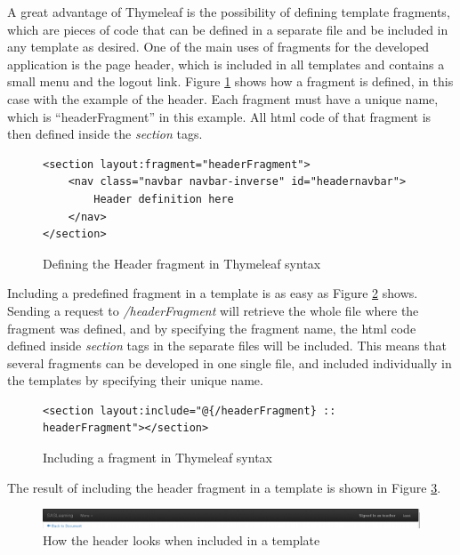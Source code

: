 A great advantage of Thymeleaf is the possibility of defining template fragments, which are pieces of code that can be defined in a separate file and be included in any template as desired. One of the main uses of fragments for the developed application is the page header, which is included in all templates and contains a small menu and the logout link. Figure \ref{figure:viewsHeaderFragment} shows how a fragment is defined, in this case with the example of the header. Each fragment must have a unique name, which is ``headerFragment'' in this example. All html code of that fragment is then defined inside the \textit{section} tags.
\begin{figure}[h]
\lstset{style=customhtml}
\begin{lstlisting}
<section layout:fragment="headerFragment">
	<nav class="navbar navbar-inverse" id="headernavbar">
		Header definition here	
	</nav>
</section>
\end{lstlisting}
\caption{Defining the Header fragment in Thymeleaf syntax}
\label{figure:viewsHeaderFragment}
\end{figure}

Including a predefined fragment in a template is as easy as Figure \ref{figure:viewsIncludeFragment} shows. Sending a request to \textit{/headerFragment} will retrieve the whole file where the fragment was defined, and by specifying the fragment name, the html code defined inside \textit{section} tags in the separate files will be included. This means that several fragments can be developed in one single file, and included individually in the templates by specifying their unique name.
\begin{figure}[h]
\lstset{style=customhtml}
\begin{lstlisting}
<section layout:include="@{/headerFragment} :: headerFragment"></section>
\end{lstlisting}
\caption{Including a fragment in Thymeleaf syntax}
\label{figure:viewsIncludeFragment}
\end{figure}

The result of including the header fragment in a template is shown in Figure \ref{figure:viewsHeaderLooks}.

\begin{figure}[h]
\centering
\includegraphics[scale=0.4]{images/header}
\caption{How the header looks when included in a template}
\label{figure:viewsHeaderLooks}
\end{figure}

